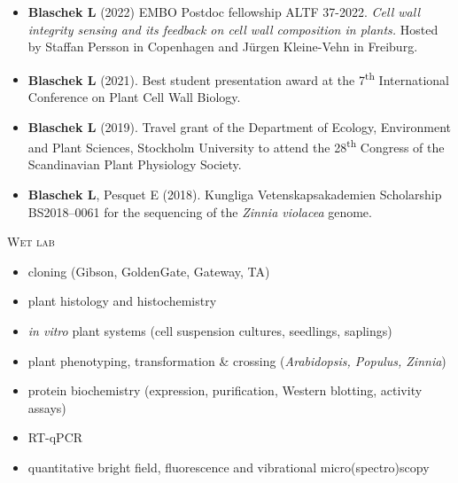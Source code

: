 \documentclass[11pt]{article}
\begin{document}
\vspace{-0.175cm}
\begin{itemize}[label={},itemindent=-9pt,leftmargin=24pt]
	\itemsep-0.1cm
	\item \textbf{Blaschek L} (2022) EMBO Postdoc fellowship ALTF 37-2022. \textit{Cell wall integrity sensing and its feedback on cell wall composition in plants.} Hosted by Staffan Persson in Copenhagen and Jürgen Kleine-Vehn in Freiburg.
	\item \textbf{Blaschek L} (2021). Best student presentation award at the 7\textsuperscript{th} International Conference on Plant Cell Wall Biology.
	\item \textbf{Blaschek L} (2019). Travel grant of the Department of Ecology, Environment and Plant Sciences, Stockholm University to attend the 28\textsuperscript{th} Congress of the Scandinavian Plant Physiology Society.
	\item \textbf{Blaschek L}, Pesquet E (2018). Kungliga Vetenskapsakademien Scholarship BS2018--0061 for the sequencing of the \textit{Zinnia violacea} genome. 
\end{itemize}
\vspace{0.3cm}


\vspace{0.3cm}

\textsc{\large{Wet lab}} 
\vspace{-0.175cm}
\begin{addmargin}[24pt]{0pt}
	\begin{multicols}{2}
		\raggedright
		\begin{itemize}[itemindent=-9pt,leftmargin=24pt]
			\itemsep-0.1cm
			\item cloning (Gibson, GoldenGate, Gateway, TA)
			\item plant histology and histochemistry
			\item \textit{in vitro} plant systems (cell suspension cultures, seedlings, saplings)
			\item plant phenotyping, transformation \& crossing (\textit{Arabidopsis, Populus, Zinnia})
			\item protein biochemistry (expression, purification, Western blotting, activity assays)
			\item RT-qPCR
			\item quantitative bright field, fluorescence and vibrational micro(spectro)scopy
		\end{itemize}
	\end{multicols}
\end{addmargin}
\vspace{0.2cm}
\end{document}
